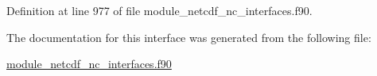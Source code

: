Definition at line 977 of file module\+\_\+netcdf\+\_\+nc\+\_\+interfaces.\+f90.



The documentation for this interface was generated from the following file\+:\begin{DoxyCompactItemize}
\item 
\hyperlink{module__netcdf__nc__interfaces_8f90}{module\+\_\+netcdf\+\_\+nc\+\_\+interfaces.\+f90}\end{DoxyCompactItemize}
